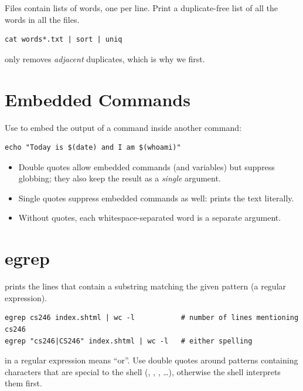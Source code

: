 \begin{example}
Files  contain lists of words, one per line. Print a
duplicate-free list of all the words in all the files.
\begin{lstlisting}[style=bash]
cat words*.txt | sort | uniq
\end{lstlisting}
\begin{center}
\end{center}
 only removes \emph{adjacent} duplicates, which is why we
 first.
\end{example}

\section{Embedded Commands}
Use  to embed the output of a command inside another command:
\begin{lstlisting}[style=bash]
echo "Today is $(date) and I am $(whoami)"
\end{lstlisting}
\begin{itemize}
  \item Double quotes allow embedded commands (and variables) but suppress
        globbing; they also keep the result as a \emph{single} argument.
  \item Single quotes suppress embedded commands as well:
         prints the text literally.
  \item Without quotes, each whitespace-separated word is a separate argument.
\end{itemize}

\section{egrep}
 prints the lines that contain a substring matching
the given pattern (a regular expression).
\begin{lstlisting}[style=bash]
egrep cs246 index.shtml | wc -l           # number of lines mentioning cs246
egrep "cs246|CS246" index.shtml | wc -l   # either spelling
\end{lstlisting}
\code{|} in a regular expression means ``or''. Use double quotes around patterns
containing characters that are special to the shell (\code{|}, \code{*},
, \dots), otherwise the shell interprets them first.

